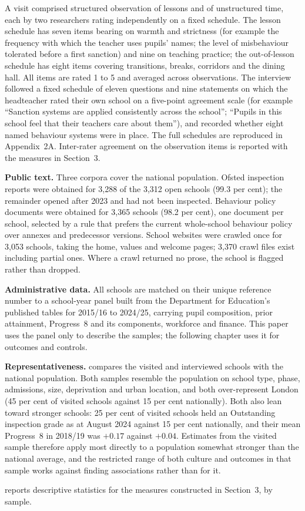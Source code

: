 A visit comprised structured observation of lessons and of unstructured time,
each by two researchers rating independently on a fixed schedule. The lesson
schedule has seven items bearing on warmth and strictness (for example the
frequency with which the teacher uses pupils' names; the level of misbehaviour
tolerated before a first sanction) and nine on teaching practice; the
out-of-lesson schedule has eight items covering transitions, breaks, corridors
and the dining hall. All items are rated 1 to 5 and averaged across
observations. The interview followed a fixed schedule of eleven questions and
nine statements on which the headteacher rated their own school on a five-point
agreement scale (for example ``Sanction systems are applied consistently across
the school''; ``Pupils in this school feel that their teachers care about
them''), and recorded whether eight named behaviour systems were in place. The
full schedules are reproduced in Appendix~2A. Inter-rater agreement on the
observation items is reported with the measures in Section~3.

\textbf{Public text.} Three corpora cover the national population. Ofsted
inspection reports were obtained for 3,288 of the 3,312 open schools
(99.3 per cent); the remainder opened after 2023 and had not been inspected.
Behaviour policy documents were obtained for 3,365 schools (98.2 per cent),
one document per school, selected by a rule that prefers the current
whole-school behaviour policy over annexes and predecessor versions. School
websites were crawled once for 3,053 schools, taking the home, values and
welcome pages; 3,370 crawl files exist including partial ones. Where a crawl
returned no prose, the school is flagged rather than dropped.

\textbf{Administrative data.} All schools are matched on their unique
reference number to a school-year panel built from the Department for
Education's published tables for 2015/16 to 2024/25, carrying pupil
composition, prior attainment, Progress~8 and its components, workforce and
finance. This paper uses the panel only to describe the samples; the
following chapter uses it for outcomes and controls.

\textbf{Representativeness.}  compares the
visited and interviewed schools with the national population. Both samples
resemble the population on school type, phase, admissions, size, deprivation
and urban location, and both over-represent London (45 per cent of visited
schools against 15 per cent nationally). Both also lean toward stronger
schools: 25 per cent of visited schools held an Outstanding inspection grade
as at August 2024 against 15 per cent nationally, and their mean Progress~8
in 2018/19 was $+0.17$ against $+0.04$. Estimates from the visited sample
therefore apply most directly to a population somewhat stronger than the
national average, and the restricted range of both culture and outcomes in
that sample works against finding associations rather than for it.

 reports descriptive statistics for the measures
constructed in Section~3, by sample.


